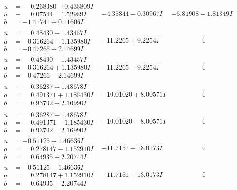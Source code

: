 \documentclass[1p]{elsarticle_modified}
\theoremstyle{definition}
\begin{document}
$$\begin{array}{c|c|c}
\begin{aligned}
u &= \phantom{-}0.268380 - 0.438809 I \\
a &= \phantom{-}0.07544 - 1.52989 I \\
b &= -1.41741 + 0.11606 I\end{aligned}
 & -4.35844 - 0.30967 I & -6.81908 - 1.81849 I \\ \hline\begin{aligned}
u &= \phantom{-}0.48430 + 1.43457 I \\
a &= -0.316264 - 1.135980 I \\
b &= -0.47266 - 2.14699 I\end{aligned}
 & -11.2265 + 9.2254 I & \phantom{-0.000000 } 0 \\ \hline\begin{aligned}
u &= \phantom{-}0.48430 - 1.43457 I \\
a &= -0.316264 + 1.135980 I \\
b &= -0.47266 + 2.14699 I\end{aligned}
 & -11.2265 - 9.2254 I & \phantom{-0.000000 } 0 \\ \hline\begin{aligned}
u &= \phantom{-}0.36287 + 1.48678 I \\
a &= \phantom{-}0.491371 + 1.185430 I \\
b &= \phantom{-}0.93702 + 2.16990 I\end{aligned}
 & -10.01020 + 8.00571 I & \phantom{-0.000000 } 0 \\ \hline\begin{aligned}
u &= \phantom{-}0.36287 - 1.48678 I \\
a &= \phantom{-}0.491371 - 1.185430 I \\
b &= \phantom{-}0.93702 - 2.16990 I\end{aligned}
 & -10.01020 - 8.00571 I & \phantom{-0.000000 } 0 \\ \hline\begin{aligned}
u &= -0.51125 + 1.46636 I \\
a &= \phantom{-}0.278147 - 1.152910 I \\
b &= \phantom{-}0.64935 - 2.20744 I\end{aligned}
 & -11.7151 - 18.0173 I & \phantom{-0.000000 } 0 \\ \hline\begin{aligned}
u &= -0.51125 - 1.46636 I \\
a &= \phantom{-}0.278147 + 1.152910 I \\
b &= \phantom{-}0.64935 + 2.20744 I\end{aligned}
 & -11.7151 + 18.0173 I & \phantom{-0.000000 } 0\\

\end{array}$$
\end{document}
